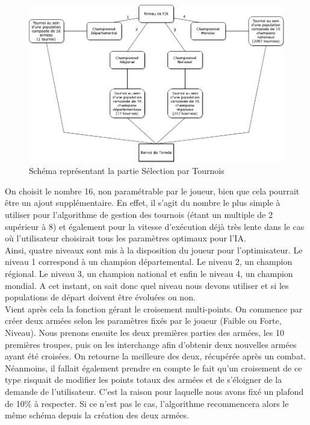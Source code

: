 \documentclass[a4paper]{article} %
\begin{document}
\begin{figure}[!h]
	\begin{center}
	\includegraphics[scale= 0.5]{Images/Championnats.png}
	\caption{Schéma représentant la partie Sélection par Tournois}
	\end{center}
\end{figure}

On choisit le nombre 16, non paramétrable par le joueur, bien que cela pourrait être un ajout supplémentaire. En effet, il s'agit du nombre le plus simple à utiliser pour l'algorithme de gestion des tournois (étant un multiple de 2 supérieur à 8) et également pour la vitesse d'exécution déjà très lente dans le cas où l'utilisateur choisirait tous les paramètres optimaux pour l'IA.\\

\label{OptiNiveaux}Ainsi, quatre niveaux sont mis à la disposition du joueur pour l'optimisateur. Le niveau 1 correspond à un champion départemental. Le niveau 2, un champion régional. Le niveau 3, un champion national et enfin le niveau 4, un champion mondial.
A cet instant, on sait donc quel niveau nous devons utiliser et si les populations de départ doivent être évoluées ou non.\\

\label{OptiCroisements}Vient après cela la fonction gérant le croisement multi-points. On commence par créer deux armées selon les paramètres fixés par le joueur (Faible ou Forte, Niveau). Nous prenons ensuite les deux premières parties des armées, les 10 premières troupes, puis on les interchange afin d'obtenir deux nouvelles armées ayant été croisées. On retourne la meilleure des deux, récupérée après un combat. Néanmoins, il fallait également prendre en compte le fait qu'un croisement de ce type risquait de modifier les points totaux des armées et de s'éloigner de la demande de l'utilisateur. C'est la raison pour laquelle nous avons fixé un plafond de 10\% à respecter. Si ce n'est pas le cas, l'algorithme recommencera alors le même schéma depuis la création des deux armées.
\end{document}
